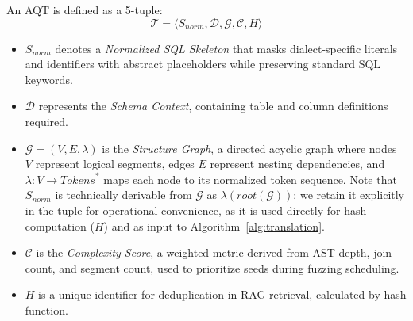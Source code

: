 \documentclass[sigconf,review,anonymous]{acmart}
\begin{document}
\begin{list}{}{\setlength{\leftmargin}{0.5em}}
\item
    \vspace{-0.5cm}
    \begin{definition}  \label{def:aqt}
    An AQT is defined as a 5-tuple:
    $$\mathcal{T} = \langle S_{norm}, \mathcal{D}, \mathcal{G}, \mathcal{C}, H  \rangle$$
    \begin{itemize}
        \item $S_{norm}$ denotes a \textit{Normalized SQL Skeleton} that masks dialect-specific literals and identifiers with abstract placeholders while preserving standard SQL keywords.
        \item $\mathcal{D}$ represents the \textit{Schema Context}, containing table and column definitions required.
        \item $\mathcal{G} = (V, E, \lambda)$ is the \textit{Structure Graph}, a directed acyclic graph where nodes $V$ represent logical segments, edges $E$ represent nesting dependencies, and $\lambda\colon V \rightarrow \mathit{Tokens}^{*}$ maps each node to its normalized token sequence. Note that $S_{norm}$ is technically derivable from $\mathcal{G}$ as $\lambda(\mathit{root}(\mathcal{G}))$; we retain it explicitly in the tuple for operational convenience, as it is used directly for hash computation ($H$) and as input to Algorithm~\ref{alg:translation}.
        \item $\mathcal{C}$ is the \textit{Complexity Score}, a weighted metric derived from AST depth, join count, and segment count, used to prioritize seeds during fuzzing scheduling.
        \item $H$ is a unique identifier for deduplication in RAG retrieval, calculated by hash function.  
        
    \end{itemize}
    \end{definition}

\end{list}
\end{document}
